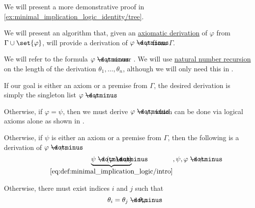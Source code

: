 \begin{comments}
  \item We will present a more demonstrative proof in \eqref{ex:minimal_implication_logic_identity/tree}.
\end{comments}

\begin{algorithm}\label{alg:derivation_conclusion_hypothesis_introduction}
  We will present an algorithm that, given an \hyperref[def:axiomatic_derivation]{axiomatic derivation} of \( \varphi \) from \( \Gamma \cup \set{ \varphi } \), will provide a derivation of \( \varphi \synimplies \varphi \) from \( \Gamma \).

  We will refer to the formula \( \varphi \synimplies \varphi \) as our . We will use \hyperref[rem:natural_number_recursion]{natural number recursion} on the length of the derivation \( \theta_1, \ldots, \theta_n \), although we will only need this in .

  \begin{thmenum}
     If our goal is either an axiom or a premise from \( \Gamma \), the desired derivation is simply the singleton list \( \varphi \synimplies \varphi \).

     Otherwise, if \( \varphi = \psi \), then we must derive \( \varphi \synimplies \varphi \), which can be done via logical axioms alone as shown in .

     Otherwise, if \( \psi \) is either an axiom or a premise from \( \Gamma \), then the following is a derivation of \( \varphi \synimplies \psi \):
    \begin{equation*}
      \underbrace{\psi \synimplies (\varphi \synimplies \psi)}_{\eqref{eq:def:minimal_implication_logic/intro}},
      \psi,
      \varphi \synimplies \psi.
    \end{equation*}

     Otherwise, there must exist indices \( i \) and \( j \) such that
    \begin{equation*}
      \theta_i = \theta_j \synimplies \theta_n.
    \end{equation*}


\end{thmenum}
\end{algorithm}
